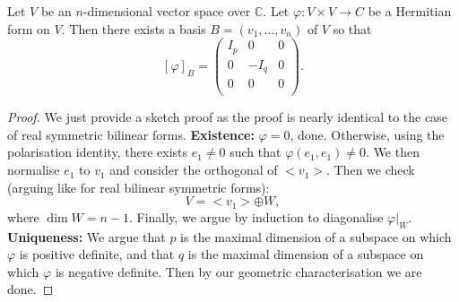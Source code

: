 \documentclass[egregdoesnotlikesansseriftitles,a4paper]{scrartcl}
\begin{document}
\begin{theorem}
      Let $V$ be an $n$-dimensional vector space over $\mathbb{C}$. Let $\varphi:V \times V \rightarrow C$ be a Hermitian form on $V$. Then there exists a basis $B=\left(v_1, \ldots , v_n\right)$ of $V$ so that 
      \[[\varphi]_B=\left(
          \begin{array}{c|c|c}
           I_p &0&0\\
           \hline
           0 &-I_q&0\\
           \hline
           0 &0&0\\
           \end{array}
           \right).\]
\end{theorem}
\begin{proof}
      We just provide a sketch proof as the proof is nearly identical to the case of real symmetric bilinear forms.\newline 
      \textbf{Existence:}\newline 
       $\varphi=0$, done. Otherwise, using the polarisation identity, there exists $e_1 \neq 0$ such that $\varphi \left(e_1,e_1\right) \neq 0$. We then normalise $e_1$ to $v_1$ and consider the orthogonal of $<v_1>$. Then we check (arguing like for real bilinear symmetric forms): 
       \[V=<v_1> \oplus W ,\]
       where $\operatorname{dim}W=n-1$. Finally, we argue by induction to diagonalise $\varphi|_W$.\newline 
       \textbf{Uniqueness:}\newline 
       We argue that $p$ is the maximal dimension of a subspace on which $\varphi$ is positive definite, and that $q$ is the maximal dimension of a subspace on which $\varphi$ is negative definite. Then by our geometric characterisation we are done.
\end{proof}
\end{document}
